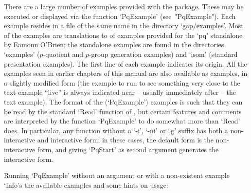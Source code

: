 

There are a large number of examples provided with the {\ANUPQ}  package.
These  may  be  executed  or  displayed  via  the  function   `PqExample'
(see~"PqExample"). Each example resides in a file of the same name in the
directory `gap/examples'. Most of the examples are translations to {\GAP}
of examples provided for the  `pq'  standalone  by  Eamonn  O'Brien;  the
standalone examples are found in the directories `examples' ($p$-quotient
and $p$-group generation  examples)  and  `isom'  (standard  presentation
examples). The first line of each example indicates its origin.  All  the
examples seen in earlier chapters of this manual are  also  available  as
examples, in a  slightly  modified  form  (the  example  to  run  to  see
something very close to the text example  ``live''  is  always  indicated
near -- usually immediately after -- the text example). The format of the
(`PqExample') examples is such that they can  be  read  by  the  standard
`Read'  function  of  {\GAP},  but  certain  features  and  comments  are
interpreted by the function `PqExample' to do somewhat more  than  `Read'
does. In particular, any function without a `-i', `-ni'  or  `.g'  suffix
has both a non-interactive and interactive  form;  in  these  cases,  the
default form is the non-interactive form, and giving `PqStart' as  second
argument generates the interactive form.

Running `PqExample' without an argument or with  a  non-existent  example
`Info's the available examples and some hints on usage:


